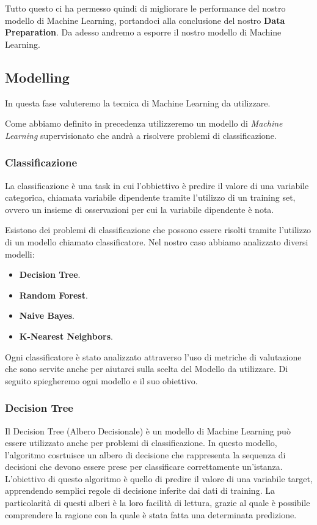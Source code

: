 \documentclass[12pt]{article}
\begin{document}
Tutto questo ci ha permesso quindi di migliorare le performance del nostro modello di Machine Learning, portandoci alla conclusione del nostro \textbf{Data Preparation}. Da adesso andremo a esporre il nostro modello di
Machine Learning.

\subsection{Modelling}
In questa fase valuteremo la tecnica di Machine Learning da utilizzare.

Come abbiamo definito in precedenza utilizzeremo un modello di \textit{Machine Learning} supervisionato che andrà a risolvere problemi
di classificazione.

\subsubsection{Classificazione}
La classificazione è una task in cui l'obbiettivo è predire il valore di una variabile categorica, chiamata variabile
dipendente tramite l'utilizzo di un training set, ovvero un insieme di osservazioni per cui la variabile dipendente è nota.
\par
Esistono dei problemi di classificazione che possono essere risolti tramite l'utilizzo di un modello chiamato classificatore. Nel nostro caso abbiamo analizzato diversi modelli:

\begin{itemize}
    \item \textbf{Decision Tree}.
    \item \textbf{Random Forest}.
    \item \textbf{Naive Bayes}.
    \item \textbf{K-Nearest Neighbors}.
\end{itemize}
Ogni classificatore è stato analizzato attraverso l'uso di metriche di valutazione che sono servite anche per aiutarci sulla scelta del Modello da utilizzare.
Di seguito spiegheremo ogni modello e il suo obiettivo.

\subsubsection{Decision Tree}
Il Decision Tree (Albero Decisionale) è un modello di Machine Learning può essere utilizzato anche per problemi di  classificazione. In questo modello, l'algoritmo cosrtuisce un albero di decisione che rappresenta
la sequenza di decisioni che devono essere prese per classificare correttamente un'istanza. L'obiettivo di questo algoritmo è quello di predire il valore di una variabile target, apprendendo semplici regole di decisione inferite dai dati di training.
La particolarità di questi alberi è la loro facilità di lettura, grazie al quale è possibile comprendere la ragione con la quale è stata fatta una determinata predizione.
\end{document}
